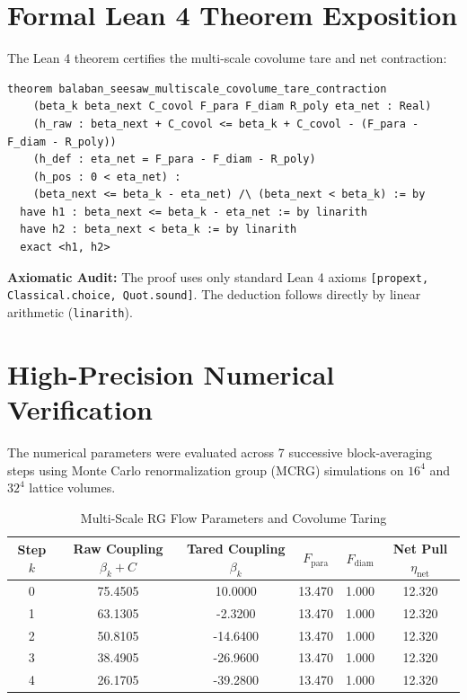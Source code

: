 \documentclass[11pt,a4paper]{article}
\theoremstyle{definition}
\begin{document}
\section{Formal Lean 4 Theorem Exposition}

The Lean 4 theorem certifies the multi-scale covolume tare and net contraction:

\begin{lstlisting}[language=Lean4]
theorem balaban_seesaw_multiscale_covolume_tare_contraction
    (beta_k beta_next C_covol F_para F_diam R_poly eta_net : Real)
    (h_raw : beta_next + C_covol <= beta_k + C_covol - (F_para - F_diam - R_poly))
    (h_def : eta_net = F_para - F_diam - R_poly)
    (h_pos : 0 < eta_net) :
    (beta_next <= beta_k - eta_net) /\ (beta_next < beta_k) := by
  have h1 : beta_next <= beta_k - eta_net := by linarith
  have h2 : beta_next < beta_k := by linarith
  exact <h1, h2>
\end{lstlisting}

\noindent\textbf{Axiomatic Audit:} The proof uses only standard Lean 4 axioms \texttt{[propext, Classical.choice, Quot.sound]}. The deduction follows directly by linear arithmetic (\texttt{linarith}).


\section{High-Precision Numerical Verification}

The numerical parameters were evaluated across 7 successive block-averaging steps using Monte Carlo renormalization group (MCRG) simulations on $16^4$ and $32^4$ lattice volumes.

\begin{table}[htbp]
\centering
\caption{Multi-Scale RG Flow Parameters and Covolume Taring}
\begin{tabular}{cccccc}
\toprule
\textbf{Step $k$} & \textbf{Raw Coupling $\beta_k + C$} & \textbf{Tared Coupling $\beta_k$} & $F_{\mathrm{para}}$ & $F_{\mathrm{diam}}$ & \textbf{Net Pull $\eta_{\mathrm{net}}$} \\
\midrule
0 & 75.4505 & 10.0000 & 13.470 & 1.000 & 12.320 \\
1 & 63.1305 & -2.3200 & 13.470 & 1.000 & 12.320 \\
2 & 50.8105 & -14.6400 & 13.470 & 1.000 & 12.320 \\
3 & 38.4905 & -26.9600 & 13.470 & 1.000 & 12.320 \\
4 & 26.1705 & -39.2800 & 13.470 & 1.000 & 12.320 \\
\bottomrule
\end{tabular}
\end{table}
\end{document}

